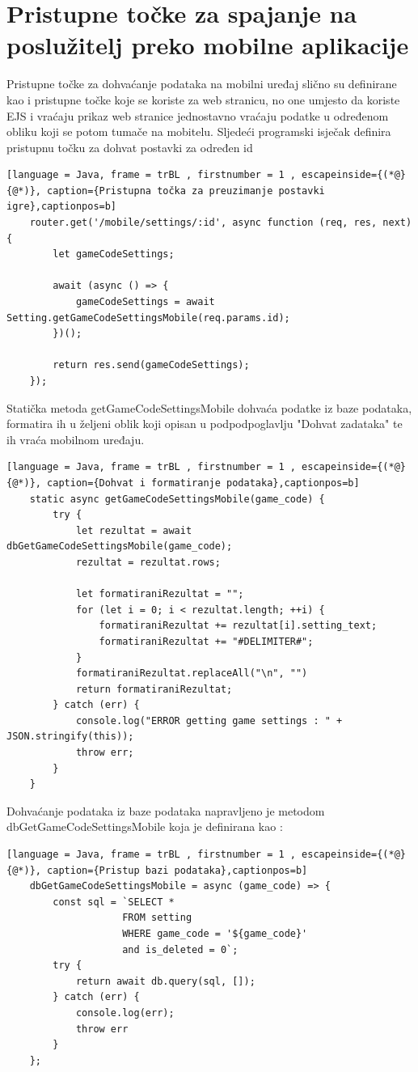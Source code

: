 \documentclass[times, utf8, zavrsni, numeric]{fer}
\begin{document}
	\section{Pristupne točke za spajanje na poslužitelj preko mobilne aplikacije}
	Pristupne točke za dohvaćanje podataka na mobilni uređaj slično su definirane kao i pristupne točke koje se koriste za web stranicu, no one umjesto da koriste EJS i vraćaju prikaz web stranice jednostavno vraćaju podatke u određenom obliku koji se potom tumače na
	mobitelu.
	Sljedeći programski isječak definira pristupnu točku za dohvat postavki za određen id
	\renewcommand{\lstlistingname}{Kôd}
	\begin{lstlisting}[language = Java, frame = trBL , firstnumber = 1 , escapeinside={(*@}{@*)}, caption={Pristupna točka za preuzimanje postavki igre},captionpos=b]
	router.get('/mobile/settings/:id', async function (req, res, next) {
		let gameCodeSettings;

		await (async () => {
			gameCodeSettings = await Setting.getGameCodeSettingsMobile(req.params.id);
		})();

		return res.send(gameCodeSettings);
	});
	\end{lstlisting}
	
	Statička metoda getGameCodeSettingsMobile dohvaća podatke iz baze podataka, formatira ih u željeni oblik koji opisan u podpodpoglavlju "Dohvat zadataka" te ih vraća mobilnom uređaju.
		\renewcommand{\lstlistingname}{Kôd}
	\begin{lstlisting}[language = Java, frame = trBL , firstnumber = 1 , escapeinside={(*@}{@*)}, caption={Dohvat i formatiranje podataka},captionpos=b]
    static async getGameCodeSettingsMobile(game_code) {
        try {
            let rezultat = await dbGetGameCodeSettingsMobile(game_code);
            rezultat = rezultat.rows;

            let formatiraniRezultat = "";
            for (let i = 0; i < rezultat.length; ++i) {
                formatiraniRezultat += rezultat[i].setting_text;
                formatiraniRezultat += "#DELIMITER#";
            }
            formatiraniRezultat.replaceAll("\n", "")
            return formatiraniRezultat;
        } catch (err) {
            console.log("ERROR getting game settings : " + JSON.stringify(this));
            throw err;
        }
    }
	\end{lstlisting}
	
	Dohvaćanje podataka iz baze podataka napravljeno je metodom dbGetGameCodeSettingsMobile koja je definirana kao :
	\renewcommand{\lstlistingname}{Kôd}
	\begin{lstlisting}[language = Java, frame = trBL , firstnumber = 1 , escapeinside={(*@}{@*)}, caption={Pristup bazi podataka},captionpos=b]
	dbGetGameCodeSettingsMobile = async (game_code) => {
		const sql = `SELECT *
					FROM setting
					WHERE game_code = '${game_code}'
					and is_deleted = 0`;
		try {
			return await db.query(sql, []);
		} catch (err) {
			console.log(err);
			throw err
		}
	};
	\end{lstlisting}
\end{document}
